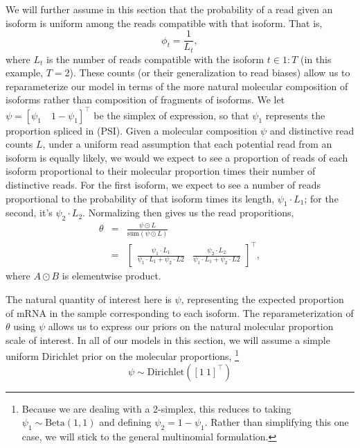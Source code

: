 \documentclass[11pt]{report}
\newcommand{\rngto}[1]{1{:}#1}
\newcommand{\vect}[1]{[#1]^{\top}}
\newcommand{\rdistro}[2]{\textrm{#1}\!\left( #2 \right)}
\begin{document}
We will further assume in this section that the probability of a read
given an isoform is uniform among the reads compatible with that
isoform.  That is,
\[
  \phi_t = \frac{1}{L_t},
\]
where $L_t$ is the number of reads compatible with the isoform
$t \in \rngto{T}$ (in this example, $T = 2$).  These counts (or their
generalization to read biases) allow us to reparameterize our model in
terms of the more natural molecular composition of isoforms rather
than composition of fragments of isoforms.  We let
$\psi = \vect{\psi_1 \quad 1 - \psi_1}$ be the simplex of expression, so
that $\psi_1$ represents the proportion spliced in (PSI).  Given a
molecular composition $\psi$ and distinctive read counts $L$, under a
uniform read assumption that each potential read from an isoform is
equally likely, we would we expect to see a proportion of reads of
each isoform proportional to their molecular proportion times their
number of distinctive reads.  For the first isoform, we expect to see
a number of reads proportional to the probability of that isoform
times its length, $\psi_1 \cdot L_1$; for the second, it's $\psi_2
\cdot L_2$.  Normalizing then gives us the read proporitions,
\begin{eqnarray*}
\theta
& = & \frac{\displaystyle \psi \odot L}
{\displaystyle \textrm{sum}(\psi \odot L)}
  \\[6pt]
  & = & 
      \begin{bmatrix}
        \frac{\displaystyle \psi_1 \cdot L_1}
             {\displaystyle \psi_1 \cdot L_1 + \psi_2 \cdot L2}
        &
        \frac{\displaystyle \psi_2 \cdot L_2}
             {\displaystyle \psi_1 \cdot L_1 + \psi_2 \cdot L2}
\end{bmatrix}^{\top},
\end{eqnarray*}
%
where $A \odot B$ is elementwise product.

The natural quantity of interest here is $\psi$, representing the
expected proportion of mRNA in the sample corresponding to each
isoform.  The reparameterization of $\theta$ using $\psi$ allows us to
express our priors on the natural molecular proportion scale of
interest.  In all of our models in this section, we will assume a
simple uniform Dirichlet prior on the molecular proportions,%
%
\footnote{Because we are dealing with a 2-simplex, this reduces to
  taking $\psi_1 \sim \textrm{Beta}(1, 1)$ and defining
  $\psi_2 = 1 - \psi_1$.  Rather than simplifying this one case,
  we will stick to the general multinomial formulation.}
%
\[
  \psi
  \sim
  \rdistro{Dirichlet}{\vect{1 \ 1}}
\]
\end{document}
